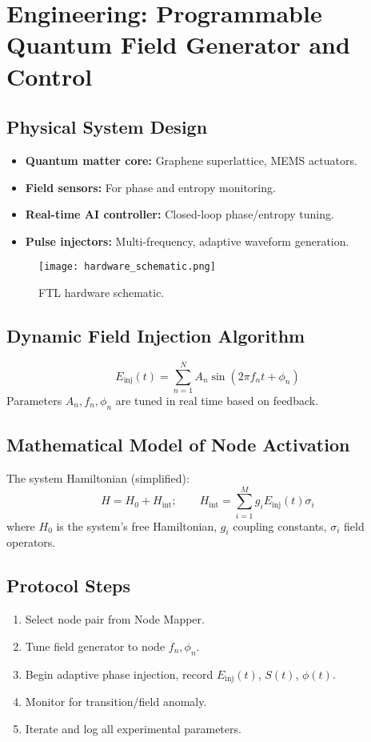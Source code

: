 \documentclass[12pt]{article}
\begin{document}
\newpage
\section{Engineering: Programmable Quantum Field Generator and Control}

\subsection{Physical System Design}
\begin{itemize}
    \item \textbf{Quantum matter core:} Graphene superlattice, MEMS actuators.
    \item \textbf{Field sensors:} For phase and entropy monitoring.
    \item \textbf{Real-time AI controller:} Closed-loop phase/entropy tuning.
    \item \textbf{Pulse injectors:} Multi-frequency, adaptive waveform generation.
\end{itemize}
\begin{figure}[H]
\centering
\texttt{[image: hardware\_schematic.png]}
\caption{FTL hardware schematic.}
\end{figure}

\subsection{Dynamic Field Injection Algorithm}
\begin{equation}
E_{\text{inj}}(t) = \sum_{n=1}^N A_n \sin(2\pi f_n t + \phi_n)
\end{equation}
Parameters $A_n, f_n, \phi_n$ are tuned in real time based on feedback.

\subsection{Mathematical Model of Node Activation}
The system Hamiltonian (simplified):
\begin{equation}
H = H_0 + H_{\text{int}}; \qquad H_{\text{int}} = \sum_{i=1}^M g_i E_{\text{inj}}(t) \sigma_i
\end{equation}
where $H_0$ is the system's free Hamiltonian, $g_i$ coupling constants, $\sigma_i$ field operators.

\subsection{Protocol Steps}
\begin{enumerate}
    \item Select node pair from Node Mapper.
    \item Tune field generator to node $f_n, \phi_n$.
    \item Begin adaptive phase injection, record $E_{\text{inj}}(t)$, $S(t)$, $\phi(t)$.
    \item Monitor for transition/field anomaly.
    \item Iterate and log all experimental parameters.
\end{enumerate}
\end{document}
